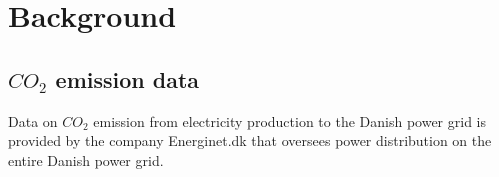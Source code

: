\documentclass[Main]{subfiles}
\begin{document}
\section{Background} %
\label{sec:background}

	\subsection{$CO_2$ emission data} %
	\label{sub:c02_emission_data}

		Data on $CO_2$ emission from electricity production to the Danish power grid is provided by the company Energinet.dk that oversees power distribution on the entire Danish power grid.



\end{document}

